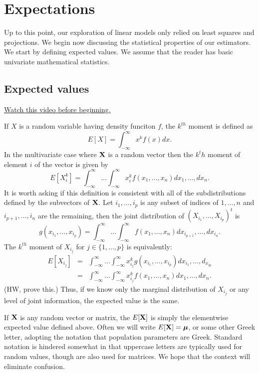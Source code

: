 \chapter{Expectations}
Up to this point, our exploration of linear models only relied on least squares
and projections. We begin now discussing the statistical properties of our
estimators. We start by defining expected values. We assume that the reader
has basic univariate mathematical statistics.

\section{Expected values}

\href{https://www.youtube.com/watch?v=6WKTzqZQgJE&list=PLpl-gQkQivXhdgUCdaUQcdb31CRe8Mm2y&index=38}{Watch this video before beginning.}

If $X$ is a random variable having density funciton $f$, 
the $k^{th}$ moment is defined as 
$$
E[X] = \int_{-\infty}^{\infty} x^k f(x) dx.
$$
In the multivariate case where $\mathbf{X}$ is a random vector
then the $k^th$ moment of element $i$ of the vector is 
given by 
$$
E[X_i^k] = \int_{-\infty}^{\infty} \ldots \int_{-\infty}^{\infty} x_i^k f(x_1, \ldots, x_n) dx_1, \ldots, dx_n.
$$
It is worth asking if this definition is consistent with all
of the subdistributions defined by the subvectors of $\mathbf{X}$. 
Let $i_1, \ldots, i_p$ is any subset of indices of $1,\ldots, n$ and
$i_{p+1}, \ldots, i_{n}$ are the remaining, then the 
joint distribution of $(X_{i_1},\ldots, X_{i_p})^t$ is 
$$
g(x_{i_1}, \ldots, x_{i_p}) = \int_{-\infty}^{\infty} \ldots \int_{-\infty}^{\infty}
f(x_1, \ldots, x_n) dx_{i_{p+1}}, \ldots, dx_{i_{n}}.
$$
The $k^{th}$ moment of $X_{i_j}$ for $j \in \{1,\ldots, p\}$ is equivalently:
\begin{eqnarray*}
E[X_{i_j}] & = & \int_{-\infty}^{\infty} \ldots \int_{-\infty}^{\infty}
x_{i_j}^k g(x_{i_1}, \ldots, x_{i_p}) dx_{i_1}, \ldots, d_{x_{ip}} \\
& = & \int_{-\infty}^{\infty} \ldots \int_{-\infty}^{\infty}
x_{i_j}^k f(x_1, \ldots, x_n) dx_1, \ldots, dx_n.
\end{eqnarray*}
(HW, prove this.) Thus, if we know only the marginal distribution 
of $X_{i_j}$ or any level of joint information, the expected value is the same.


If $\mathbf{X}$ is any random vector or matrix, the $E[\mathbf{X}]$ is 
simply the elementwise expected value defined above. Often
we will write $E[\mathbf{X}] = \boldsymbol{\mu}$, or some other Greek letter,
adopting the notation that population parameters are Greek.
Standard notation is hindered somewhat in that uppercase letters
are typically used for random values, though are also used
for matrices. We hope that the context will eliminate confusion.

